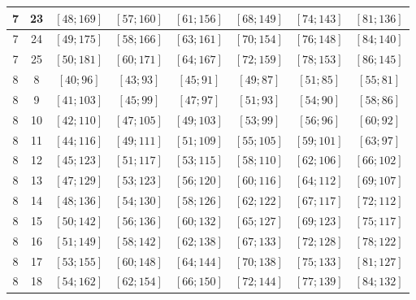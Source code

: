 \documentclass[a4paper,12pt]{article}
\begin{document}
\begin{center}
{\begin{longtable}[H]{|c|c|c|c|c|c|c|c|}
7 &  23 &  $\left[ 48; 169\right]$ &  $\left[ 57; 160\right]$ &  $\left[ 61; 156\right]$ &  $\left[ 68; 149\right]$ &  $\left[ 74; 143\right]$ &  $\left[ 81; 136\right]$ \tabularnewline \hline
7 &  24 &  $\left[ 49; 175\right]$ &  $\left[ 58; 166\right]$ &  $\left[ 63; 161\right]$ &  $\left[ 70; 154\right]$ &  $\left[ 76; 148\right]$ &  $\left[ 84; 140\right]$ \tabularnewline \hline
7 &  25 &  $\left[ 50; 181\right]$ &  $\left[ 60; 171\right]$ &  $\left[ 64; 167\right]$ &  $\left[ 72; 159\right]$ &  $\left[ 78; 153\right]$ &  $\left[ 86; 145\right]$ \tabularnewline \hline
8 &  8 &  $\left[ 40; 96\right]$ &  $\left[ 43; 93\right]$ &  $\left[ 45; 91\right]$ &  $\left[ 49; 87\right]$ &  $\left[ 51; 85\right]$ &  $\left[ 55; 81\right]$ \tabularnewline \hline
8 &  9 &  $\left[ 41; 103\right]$ &  $\left[ 45; 99\right]$ &  $\left[ 47; 97\right]$ &  $\left[ 51; 93\right]$ &  $\left[ 54; 90\right]$ &  $\left[ 58; 86\right]$ \tabularnewline \hline
8 &  10 &  $\left[ 42; 110\right]$ &  $\left[ 47; 105\right]$ &  $\left[ 49; 103\right]$ &  $\left[ 53; 99\right]$ &  $\left[ 56; 96\right]$ &  $\left[ 60; 92\right]$ \tabularnewline \hline
8 &  11 &  $\left[ 44; 116\right]$ &  $\left[ 49; 111\right]$ &  $\left[ 51; 109\right]$ &  $\left[ 55; 105\right]$ &  $\left[ 59; 101\right]$ &  $\left[ 63; 97\right]$ \tabularnewline \hline
8 &  12 &  $\left[ 45; 123\right]$ &  $\left[ 51; 117\right]$ &  $\left[ 53; 115\right]$ &  $\left[ 58; 110\right]$ &  $\left[ 62; 106\right]$ &  $\left[ 66; 102\right]$ \tabularnewline \hline
8 &  13 &  $\left[ 47; 129\right]$ &  $\left[ 53; 123\right]$ &  $\left[ 56; 120\right]$ &  $\left[ 60; 116\right]$ &  $\left[ 64; 112\right]$ &  $\left[ 69; 107\right]$ \tabularnewline \hline
8 &  14 &  $\left[ 48; 136\right]$ &  $\left[ 54; 130\right]$ &  $\left[ 58; 126\right]$ &  $\left[ 62; 122\right]$ &  $\left[ 67; 117\right]$ &  $\left[ 72; 112\right]$ \tabularnewline \hline
8 &  15 &  $\left[ 50; 142\right]$ &  $\left[ 56; 136\right]$ &  $\left[ 60; 132\right]$ &  $\left[ 65; 127\right]$ &  $\left[ 69; 123\right]$ &  $\left[ 75; 117\right]$ \tabularnewline \hline
8 &  16 &  $\left[ 51; 149\right]$ &  $\left[ 58; 142\right]$ &  $\left[ 62; 138\right]$ &  $\left[ 67; 133\right]$ &  $\left[ 72; 128\right]$ &  $\left[ 78; 122\right]$ \tabularnewline \hline
8 &  17 &  $\left[ 53; 155\right]$ &  $\left[ 60; 148\right]$ &  $\left[ 64; 144\right]$ &  $\left[ 70; 138\right]$ &  $\left[ 75; 133\right]$ &  $\left[ 81; 127\right]$ \tabularnewline \hline
8 &  18 &  $\left[ 54; 162\right]$ &  $\left[ 62; 154\right]$ &  $\left[ 66; 150\right]$ &  $\left[ 72; 144\right]$ &  $\left[ 77; 139\right]$ &  $\left[ 84; 132\right]$ \tabularnewline \hline

\end{longtable}}
\end{center}
\end{document}
